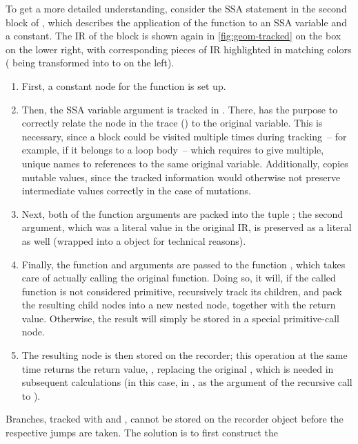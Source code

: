 To get a more detailed understanding, consider the SSA statement  in the second
block of , which describes the application of the function \jlinl{+} to an SSA variable
and a constant.  The IR of the block is shown again in \ref{fig:geom-tracked} on the box on the
lower right, with corresponding pieces of IR highlighted in matching colors ( being
transformed into  to  on the left).
\begin{enumerate}
  \firmlist
\item First, a constant node  for the function is set up.
\item Then, the SSA variable argument  is tracked in .  There,
   has the purpose to correctly relate the node in the trace () to
  the original variable.  This is necessary, since a block could be visited multiple times during
  tracking~-- for example, if it belongs to a loop body~-- which requires to give multiple, unique
  names to references to the same original variable.  Additionally,  copies
  mutable values, since the tracked information would otherwise not preserve intermediate values
  correctly in the case of mutations.
\item Next, both of the function arguments are packed into the tuple ; the second
  argument, which was a literal value  in the original IR, is preserved as a literal as
  well (wrapped into a  object for technical reasons).
\item Finally, the function and arguments are passed to the function , which
  takes care of actually calling the original function.  Doing so, it will, if the called function
  is not considered primitive, recursively track its children, and pack the resulting child nodes
  into a new nested node, together with the return value.  Otherwise, the result will simply be
  stored in a special primitive-call node.
\item The resulting node is then stored on the recorder; this operation at the same time returns the
  return value, , replacing the original , which is needed in subsequent
  calculations (in this case, in , as the argument of the recursive call to
  ).
\end{enumerate}
Branches, tracked with  and , cannot be stored on the
recorder object before the respective jumps are taken.  The solution is to first construct the
